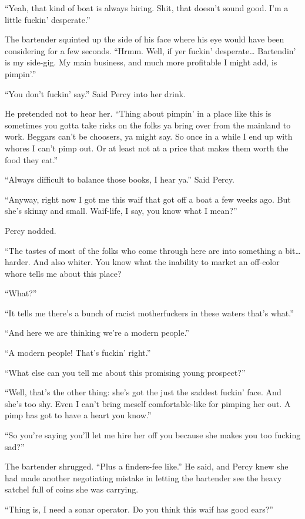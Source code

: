 \documentclass[
]{scrbook}
\begin{document}
``Yeah, that kind of boat is always hiring. Shit, that doesn't sound
good. I'm a little fuckin' desperate.''

The bartender squinted up the side of his face where his eye would have
been considering for a few seconds. ``Hrmm. Well, if yer fuckin'
desperate\ldots{} Bartendin' is my side-gig. My main business, and much
more profitable I might add, is pimpin'.''

``You don't fuckin' say.'' Said Percy into her drink.

He pretended not to hear her. ``Thing about pimpin' in a place like this
is sometimes you gotta take risks on the folks ya bring over from the
mainland to work. Beggars can't be choosers, ya might say. So once in a
while I end up with whores I can't pimp out. Or at least not at a price
that makes them worth the food they eat.''

``Always difficult to balance those books, I hear ya.'' Said Percy.

``Anyway, right now I got me this waif that got off a boat a few weeks
ago. But she's skinny and small. Waif-life, I say, you know what I
mean?''

Percy nodded.

``The tastes of most of the folks who come through here are into
something a bit\ldots{} harder. And also whiter. You know what the
inability to market an off-color whore tells me about this place?

``What?''

``It tells me there's a bunch of racist motherfuckers in these waters
that's what.''

``And here we are thinking we're a modern people.''

``A modern people! That's fuckin' right.''

``What else can you tell me about this promising young prospect?''

``Well, that's the other thing: she's got the just the saddest fuckin'
face. And she's too shy. Even I can't bring meself comfortable-like for
pimping her out. A pimp has got to have a heart you know.''

``So you're saying you'll let me hire her off you because she makes you
too fucking sad?''

The bartender shrugged. ``Plus a finders-fee like.'' He said, and Percy
knew she had made another negotiating mistake in letting the bartender
see the heavy satchel full of coins she was carrying.

``Thing is, I need a sonar operator. Do you think this waif has good
ears?''
\end{document}
